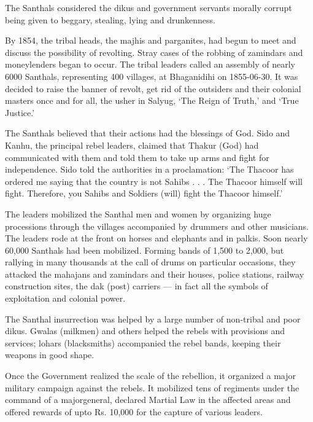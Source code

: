 The Santhals considered the dikus and government servants morally corrupt being given to beggary, stealing, lying and drunkenness.

By 1854, the tribal heads, the majhis and parganites, had begun to meet and discuss the possibility of revolting. Stray cases of the robbing of zamindars and moneylenders began to occur. The tribal leaders called an assembly of nearly 6000 Santhals, representing 400 villages, at Bhaganidihi on 1855-06-30. It was decided to raise the banner of revolt, get rid of the outsiders and their colonial masters once and for all, the usher in Salyug, ‘The Reign of Truth,’ and ‘True Justice.’

The Santhals believed that their actions had the blessings of God. Sido and Kanhu, the principal rebel leaders, claimed that Thakur (God) had communicated with them and told them to take up arms and fight for independence. Sido told the authorities in a proclamation: ‘The Thacoor has ordered me saying that the country is not Sahibs . . . The Thacoor himself will fight. Therefore, you Sahibs and Soldiers (will) fight the Thacoor himself.’

The leaders mobilized the Santhal men and women by organizing huge processions through the villages accompanied by drummers and other musicians. The leaders rode at the front on horses and elephants and in palkis. Soon nearly 60,000 Santhals had been mobilized. Forming bands of 1,500 to 2,000, but rallying in many thousands at the call of drums on particular occasions, they attacked the mahajans and zamindars and their houses, police stations, railway construction sites, the dak (post) carriers — in fact all the symbols of exploitation and colonial power.

The Santhal insurrection was helped by a large number of non-tribal and poor dikus. Gwalas (milkmen) and others helped the rebels with provisions and services; lohars (blacksmiths) accompanied the rebel bands, keeping their weapons in good shape.

Once the Government realized the scale of the rebellion, it organized a major military campaign against the rebels. It mobilized tens of regiments under the command of a major­general, declared Martial Law in the affected areas and offered rewards of upto Rs. 10,000 for the capture of various leaders.

